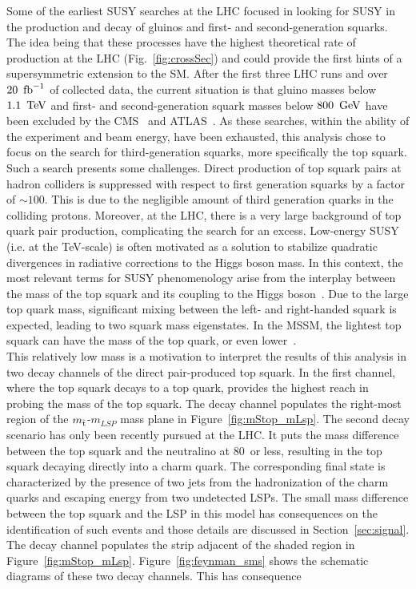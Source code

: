 \indent Some of the earliest SUSY searches at the LHC focused in 
looking for SUSY in the production and decay of gluinos and first- and 
second-generation squarks. The idea being that these processes have the highest 
theoretical rate of production at the LHC (Fig.~\ref{fig:crossSec}) and could provide the first hints of a 
supersymmetric extension to the SM. After the first three LHC runs and over $20~\mbox{\ensuremath{\,\text{fb}^\text{$-$1}}}$ of
collected data, the current situation is that gluino masses below $1.1~\,\text{Te\hspace{-.08em}V}$ and first- and 
second-generation squark masses below $800~\,\text{Ge\hspace{-.08em}V}$ have been excluded by the CMS~\cite{cms-susy} 
and ATLAS~\cite{atlas-susy}. As these searches, within the ability of the experiment and beam energy,
have been exhausted, this analysis chose to focus on the search for third-generation 
squarks, more specifically the top squark.\\
\indent Such a search presents some challenges. Direct production of top squark pairs at hadron 
colliders is suppressed with respect to first generation squarks by a factor of $\sim100$. This is 
due to the negligible amount of third generation quarks in the colliding protons. Moreover, at 
the LHC, there is a very large background of top quark pair production, complicating the search for an excess.
Low-energy SUSY (i.e. at the TeV-scale) is often motivated as a solution to 
stabilize quadratic divergences in radiative corrections to the Higgs boson mass. In this
context, the most relevant terms for SUSY phenomenology arise from the interplay between 
the mass of the top squark and its coupling to the Higgs boson~\cite{Agashe:2014kda}. 
Due to the large top quark mass, significant mixing between the left- and right-handed squark
is expected, leading to two squark mass eigenstates. In the MSSM, the lightest top squark
can have the mass of the top quark, or even lower~\cite{Martin:1997ns}.\\
\indent This relatively low mass is a motivation to interpret the results of this 
analysis in two decay channels of the direct pair-produced top squark. 
In the first channel, where the top squark decays to a top quark, provides the highest reach 
in probing the mass of the top squark. The decay channel populates the right-most region of the 
$m_{\tilde{\rm t}}$-$m_{LSP}$ mass plane in Figure~\ref{fig:mStop_mLsp}.
The second decay scenario has only been recently pursued at the LHC. It puts 
the mass difference between the top squark and the neutralino at 80~\GeV or 
less, resulting in the top squark decaying directly into a charm quark. 
The corresponding final state is characterized by the presence of two jets from 
the hadronization of the charm quarks and escaping energy from two undetected LSPs.
The small mass difference between the top squark and the LSP in this model has consequences on the 
identification of such events and those details are discussed in Section~\ref{sec:signal}.
The decay channel populates the strip adjacent of the shaded region in Figure~\ref{fig:mStop_mLsp}.
Figure~\ref{fig:feynman_sms} shows the schematic diagrams of these two decay channels. This
has consequence

